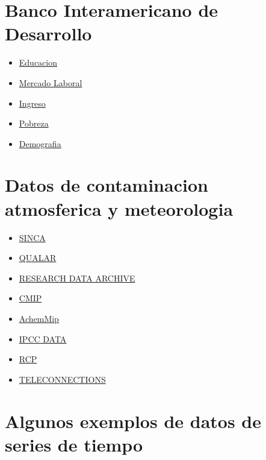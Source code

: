 \documentclass[]{book}
\providecommand{\tightlist}{%
  \setlength{\itemsep}{0pt}\setlength{\parskip}{0pt}}
\begin{document}
\hypertarget{banco-interamericano-de-desarrollo}{%
\section{Banco Interamericano de Desarrollo}\label{banco-interamericano-de-desarrollo}}

\begin{itemize}
\tightlist
\item
  \href{http://www.iadb.org/en/research-and-data//tables,6882.html?indicator=2}{Educacion}
\item
  \href{http://www.iadb.org/en/research-and-data//tables,6882.html?indicator=2}{Mercado Laboral}
\item
  \href{http://www.iadb.org/es/investigacion-y-datos//tablas,6882.html?indicator=4}{Ingreso}
\item
  \href{http://www.iadb.org/es/investigacion-y-datos//pobreza,7526.html}{Pobreza}
\item
  \href{http://www.iadb.org/es/investigacion-y-datos//tablas,6882.html?indicator=1}{Demografia}
\end{itemize}

\hypertarget{datos-de-contaminacion-atmosferica-y-meteorologia}{%
\section{Datos de contaminacion atmosferica y meteorologia}\label{datos-de-contaminacion-atmosferica-y-meteorologia}}

\begin{itemize}
\tightlist
\item
  \href{https://sinca.mma.gob.cl/}{SINCA}
\item
  \href{https://qualar.cetesb.sp.gov.br/qualar/home.do}{QUALAR}
\item
  \href{https://rda.ucar.edu/}{RESEARCH DATA ARCHIVE}
\item
  \href{https://esgf-node.llnl.gov/projects/cmip6/}{CMIP}
\item
  \href{https://wiki.met.no/aerocom/aerchemmip/start}{AchemMip}
\item
  \href{https://www.ipcc.ch/data/}{IPCC DATA}
\item
  \href{http://www.iiasa.ac.at/web-apps/tnt/RcpDb/dsd?Action=htmlpage\&page=welcome}{RCP}
\item
  \href{https://www.ncdc.noaa.gov/teleconnections/}{TELECONNECTIONS}
\end{itemize}

\hypertarget{algunos-exemplos-de-datos-de-series-de-tiempo}{%
\section{Algunos exemplos de datos de series de tiempo}\label{algunos-exemplos-de-datos-de-series-de-tiempo}}
\end{document}
